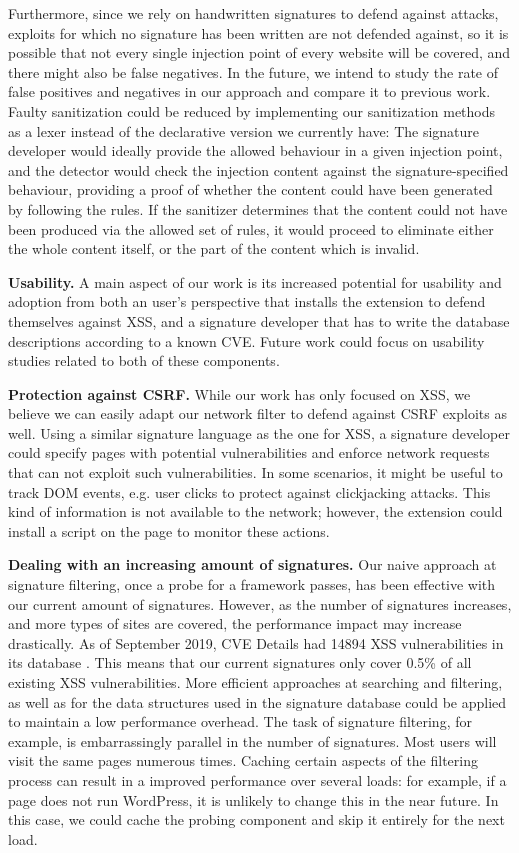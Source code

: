  Furthermore, since we rely on handwritten signatures to defend against attacks, exploits for which no signature has been written are not defended against, so it is possible that not every single injection point of every website will be covered, and there might also be false negatives. In the future, we intend to study the rate of false positives and negatives in our approach and compare it to previous work. Faulty sanitization could be reduced by implementing our sanitization methods as a lexer instead of the declarative version we currently have: The signature developer would ideally provide the allowed behaviour in a given injection point, and the detector would check the injection content against the signature-specified behaviour, providing a proof of whether the content could have been generated by following the rules. If the sanitizer determines that the content could not have been produced via the allowed set of rules, it would proceed to eliminate either the whole content itself, or the part of the content which is invalid.

\textbf{Usability.} A main aspect of our work is its increased potential for usability and adoption from both an user's perspective that installs the extension to defend themselves against \ac{XSS}, and a signature developer that has to write the database descriptions according to a known CVE. Future work could focus on usability studies related to both of these components.

\textbf{Protection against CSRF.} While our work has only focused on \ac{XSS}, we believe we can easily adapt our network filter to defend against CSRF exploits as well. Using a similar signature language as the one for \ac{XSS}, a signature developer could specify pages with potential vulnerabilities and enforce network requests that can not exploit such vulnerabilities. In some scenarios, it might be useful to track DOM events, e.g. user clicks to protect against clickjacking attacks. This kind of information is not available to the network; however, the extension could install a script on the page to monitor these actions. 

\textbf{Dealing with an increasing amount of signatures.} Our naive approach at signature filtering, once a probe for a framework passes, has been effective with our current amount of signatures. However, as the number of signatures increases, and more types of sites are covered, the performance impact may increase drastically. As of September 2019, CVE Details had 14894 \ac{XSS} vulnerabilities in its database \cite{vulnbytype}. This means that our current signatures only cover 0.5\% of all existing \ac{XSS} vulnerabilities. More efficient approaches at searching and filtering, as well as for the data structures used in the signature database could be applied to maintain a low performance overhead. The task of signature filtering, for example, is embarrassingly parallel in the number of signatures. Most users will visit the same pages numerous times. Caching certain aspects of the filtering process can result in a improved performance over several loads: for example, if a page does not run WordPress, it is unlikely to change this in the near future. In this case, we could cache the probing component and skip it entirely for the next load.

